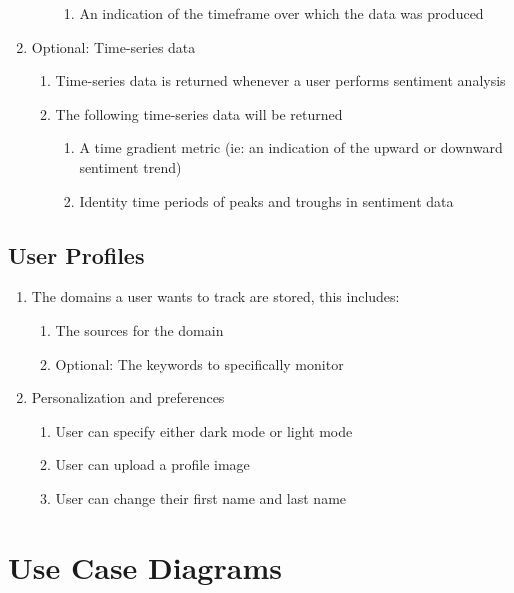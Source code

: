 \documentclass[12pt]{article}
\begin{document}
\begin{enumerate}
\begin{enumerate}
\begin{enumerate}
                  \item An indication of the timeframe over which the data was produced
                \end{enumerate}
        \end{enumerate}
  \item Optional: Time-series data
        \begin{enumerate}
          \item Time-series data is returned whenever a user performs sentiment analysis
          \item The following time-series data will be returned
                \begin{enumerate}
                  \item A time gradient metric (ie: an indication of the upward or downward sentiment trend)
                  \item Identity time periods of peaks and troughs in sentiment data
                \end{enumerate}
        \end{enumerate}
\end{enumerate}

\subsection{User Profiles}
\begin{enumerate}
  \item The domains a user wants to track are stored, this includes:
        \begin{enumerate}
          \item The sources for the domain
          \item Optional: The keywords to specifically monitor
        \end{enumerate}
  \item Personalization and preferences
        \begin{enumerate}
          \item User can specify either dark mode or light mode
          \item User can upload a profile image
          \item User can change their first name and last name
        \end{enumerate}
\end{enumerate}

\newpage
\section{Use Case Diagrams}
\end{document}
